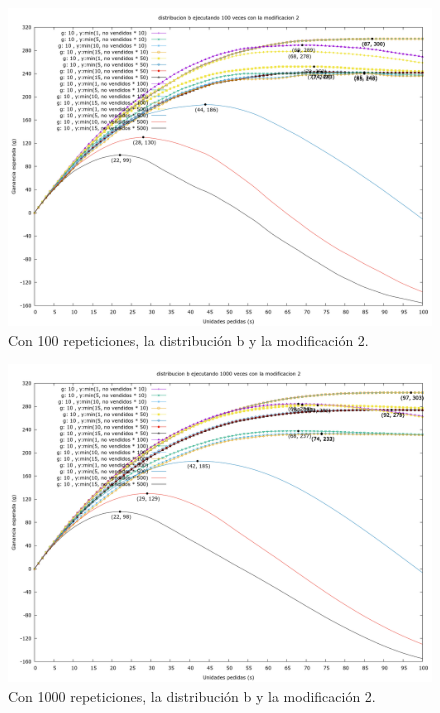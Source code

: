\documentclass[12pt, spanish]{article}
\begin{document}
\begin{figure}[H]
	\centering
	\includegraphics[scale = 0.3]{prob_b/datos_b_100_2.png}
	\caption{Con 100 repeticiones, la distribución b y la modificación 2.}
	\label{fig:ej1_a_100}

\end{figure}

\begin{figure}[H]
	\centering
	\includegraphics[scale = 0.3]{prob_b/datos_b_1000_2.png}
	\caption{Con 1000 repeticiones, la distribución b y la modificación 2.}
	\label{fig:ej1_a_1000}

\end{figure}
\end{document}
